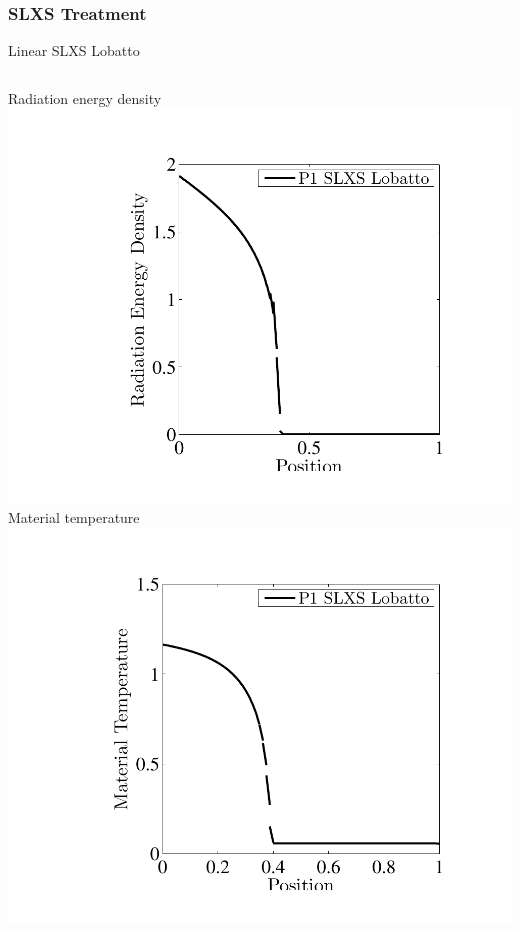 \documentclass{beamer}
\begin{document}
\begin{frame}
\frametitle{SLXS Treatment}
Linear SLXS Lobatto
\begin{columns}[t]
\centering
Radiation energy density
\includegraphics[width=\textwidth,trim=1.2in  0.2in 0.75in 0.5in,clip=true]{../chapter6_grey_radtran/Dissertation_Data/SLXS_Lobatto_80_Cells_Radiation.pdf}
\centering
Material temperature
\includegraphics[width=\textwidth,trim=1.2in  0.2in 0.75in 0.5in,clip=true]{../chapter6_grey_radtran/Dissertation_Data/SLXS_Lobatto_80_Cells_Temperature.pdf}
\end{columns}
\end{frame}
\end{document}
